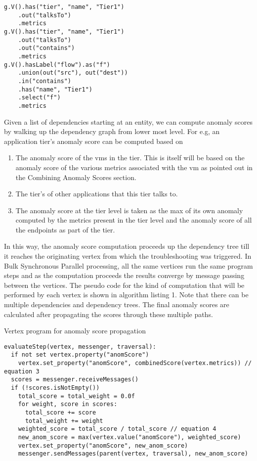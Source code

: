 \documentclass[times, twoside, watermark]{zHenriquesLab-StyleBioRxiv}
\begin{document}
\begin{lstlisting}
g.V().has("tier", "name", "Tier1")
	.out("talksTo")
	.metrics
g.V().has("tier", "name", "Tier1")
	.out("talksTo")
	.out("contains")
	.metrics
g.V().hasLabel("flow").as("f")
	.union(out("src"), out("dest"))
	.in("contains")
	.has("name", "Tier1")
	.select("f")
	.metrics
\end{lstlisting}	

Given a list of dependencies starting at an entity, we can compute anomaly scores by walking up the dependency graph from lower most level. For e.g, an application tier's anomaly score can be computed based on
\begin{enumerate}
\item The anomaly score of the vms in the tier. This is itself will be based on the anomaly score of the various metrics associated with the vm as pointed out in the Combining Anomaly Scores section.
\item The tier's of other applications that this tier talks to.
\item The anomaly score at the tier level is taken as the max of its own anomaly computed by the metrics present in the tier level and the anomaly score of all the endpoints as part of the tier. 
\end{enumerate}

In this way, the anomaly score computation proceeds up the dependency tree till it reaches the originating vertex from which the troubleshooting was triggered. In Bulk Synchronous Parallel processing, all the same vertices run the same program steps and as the computation proceeds the results converge by message passing between the vertices. The pseudo code for the kind of computation that will be performed by each vertex is shown in algorithm listing 1. Note that there can be multiple dependencies and dependency trees. The final anomaly scores are calculated after propagating the scores through these multiple paths.

\begin{algorithm*}
\caption{Vertex program for anomaly score propagation} 
\begin{verbatim}
evaluateStep(vertex, messenger, traversal):
  if not set vertex.property("anomScore")
    vertex.set_property("anomScore", combinedScore(vertex.metrics)) // equation 3
  scores = messenger.receiveMessages()
  if (!scores.isNotEmpty())
    total_score = total_weight = 0.0f
    for weight, score in scores:
      total_score += score
      total_weight += weight
    weighted_score = total_score / total_score // equation 4
    new_anom_score = max(vertex.value("anomScore"), weighted_score)
    vertex.set_property("anomScore", new_anom_score)
    messenger.sendMessages(parent(vertex, traversal), new_anom_score)
\end{verbatim}    
\end{algorithm*}
\end{document}
